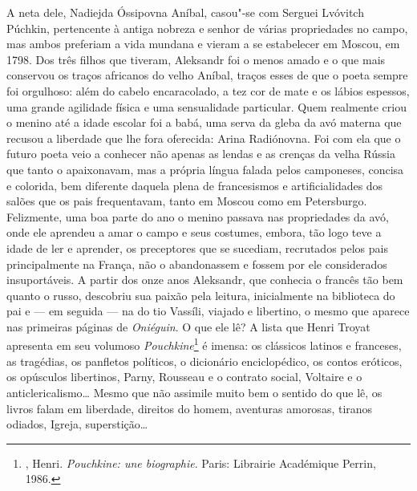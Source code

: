 A neta dele, Nadiejda Óssipovna Aníbal, casou"-se com Serguei Lvóvitch
Púchkin, pertencente à antiga nobreza e senhor de várias
propriedades no campo, mas ambos preferiam a vida mundana e vieram a se
estabelecer em Moscou, em 1798. Dos três filhos que tiveram, Aleksandr
foi o menos amado e o que mais conservou os traços africanos do velho
Aníbal, traços esses de que o poeta sempre foi orgulhoso: além do cabelo
encaracolado, a tez cor de mate e os lábios espessos, uma grande
agilidade física e uma sensualidade particular. Quem realmente criou o
menino até a idade escolar foi a babá, uma serva da gleba da avó
materna que recusou a liberdade que lhe fora oferecida: Arina
Radiónovna. Foi com ela que o futuro poeta veio a conhecer não apenas as
lendas e as crenças da velha Rússia que tanto o apaixonavam, mas a própria
língua falada pelos camponeses, concisa e colorida, bem diferente
daquela plena de francesismos e artificialidades dos salões que os pais
frequentavam, tanto em Moscou como em Petersburgo. Felizmente, uma boa
parte do ano o menino passava nas propriedades da avó, onde ele aprendeu
a amar o campo e seus costumes, embora, tão logo teve a idade de ler e
aprender, os preceptores que se sucediam, recrutados pelos pais
principalmente na França, não o abandonassem e fossem por ele
considerados insuportáveis. A partir dos onze anos Aleksandr, que
conhecia o francês tão bem quanto o russo, descobriu sua paixão pela
leitura, inicialmente na biblioteca do pai e --- em seguida --- na
do tio Vassíli, viajado e libertino, o mesmo que aparece nas
primeiras páginas de \emph{Oniéguin}. O que ele lê? A lista que
Henri Troyat apresenta em seu volumoso
\emph{Pouchkine}\footnote{, Henri.
\emph{Pouchkine: une biographie}. Paris: Librairie Académique Perrin,
1986.} é imensa: os clássicos latinos e franceses, as tragédias, os
panfletos políticos, o dicionário enciclopédico, os contos eróticos,
os opúsculos libertinos, Parny, Rousseau e o contrato social,
Voltaire e o anticlericalismo\ldots{} Mesmo que não assimile muito
bem o sentido do que lê, os livros falam em liberdade, direitos do
homem, aventuras amorosas, tiranos odiados, Igreja, superstição\ldots{}

